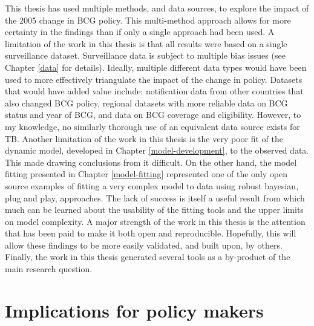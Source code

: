 \documentclass[11pt,twoside]{bristolthesis}
\begin{document}
  This thesis has used multiple methods, and data sources, to explore the impact of the 2005 change in BCG policy. This multi-method approach allows for more certainty in the findings than if only a single approach had been used. A limitation of the work in this thesis is that all results were based on a single surveillance dataset. Surveillance data is subject to multiple bias issues (see Chapter \ref{data} for details). Ideally, multiple different data types would have been used to more effectively triangulate the impact of the change in policy. Datasets that would have added value include: notification data from other countries that also changed BCG policy, regional datasets with more reliable data on BCG status and year of BCG, and data on BCG coverage and eligibility. However, to my knowledge, no similarly thorough use of an equivalent data source exists for TB. Another limitation of the work in this thesis is the very poor fit of the dynamic model, developed in Chapter \ref{model-development}, to the observed data. This made drawing conclusions from it difficult. On the other hand, the model fitting presented in Chapter \ref{model-fitting} represented one of the only open source examples of fitting a very complex model to data using robust bayesian, plug and play, approaches. The lack of success is itself a useful result from which much can be learned about the usability of the fitting tools and the upper limits on model complexity. A major strength of the work in this thesis is the attention that has been paid to make it both open and reproducible. Hopefully, this will allow these findings to be more easily validated, and built upon, by others. Finally, the work in this thesis generated several tools as a by-product of the main research question.
  
  \hypertarget{implications-for-policy-makers}{%
  \section{Implications for policy makers}\label{implications-for-policy-makers}}
  
\end{document}

